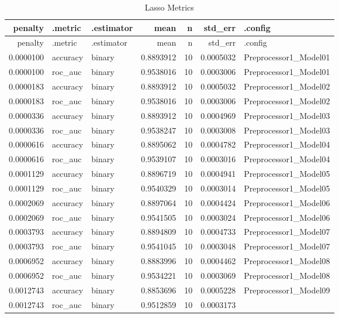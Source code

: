 \documentclass[
]{article}
\begin{document}
\begin{longtable}[]{@{}rllrrrl@{}}
\caption{Lasso Metrics\label{tbl:lasso_metrics}}\tabularnewline
\toprule
penalty & .metric & .estimator & mean & n & std\_err & .config \\
\midrule
\endfirsthead
\toprule
penalty & .metric & .estimator & mean & n & std\_err & .config \\
\midrule
\endhead
0.0000100 & accuracy & binary & 0.8893912 & 10 & 0.0005032 &
Preprocessor1\_Model01 \\
0.0000100 & roc\_auc & binary & 0.9538016 & 10 & 0.0003006 &
Preprocessor1\_Model01 \\
0.0000183 & accuracy & binary & 0.8893912 & 10 & 0.0005032 &
Preprocessor1\_Model02 \\
0.0000183 & roc\_auc & binary & 0.9538016 & 10 & 0.0003006 &
Preprocessor1\_Model02 \\
0.0000336 & accuracy & binary & 0.8893912 & 10 & 0.0004969 &
Preprocessor1\_Model03 \\
0.0000336 & roc\_auc & binary & 0.9538247 & 10 & 0.0003008 &
Preprocessor1\_Model03 \\
0.0000616 & accuracy & binary & 0.8895062 & 10 & 0.0004782 &
Preprocessor1\_Model04 \\
0.0000616 & roc\_auc & binary & 0.9539107 & 10 & 0.0003016 &
Preprocessor1\_Model04 \\
0.0001129 & accuracy & binary & 0.8896719 & 10 & 0.0004941 &
Preprocessor1\_Model05 \\
0.0001129 & roc\_auc & binary & 0.9540329 & 10 & 0.0003014 &
Preprocessor1\_Model05 \\
0.0002069 & accuracy & binary & 0.8897064 & 10 & 0.0004424 &
Preprocessor1\_Model06 \\
0.0002069 & roc\_auc & binary & 0.9541505 & 10 & 0.0003024 &
Preprocessor1\_Model06 \\
0.0003793 & accuracy & binary & 0.8894809 & 10 & 0.0004733 &
Preprocessor1\_Model07 \\
0.0003793 & roc\_auc & binary & 0.9541045 & 10 & 0.0003048 &
Preprocessor1\_Model07 \\
0.0006952 & accuracy & binary & 0.8883996 & 10 & 0.0004462 &
Preprocessor1\_Model08 \\
0.0006952 & roc\_auc & binary & 0.9534221 & 10 & 0.0003069 &
Preprocessor1\_Model08 \\
0.0012743 & accuracy & binary & 0.8853696 & 10 & 0.0005228 &
Preprocessor1\_Model09 \\
0.0012743 & roc\_auc & binary & 0.9512859 & 10 & 0.0003173 &

\end{longtable}
\end{document}
